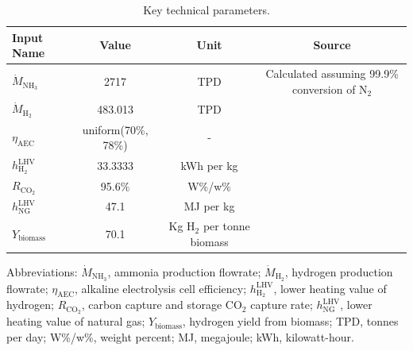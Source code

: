 \documentclass{article}
\begin{document}
\begin{table}[H]
  \centering
  \caption{Key technical parameters.}
  \label{table:si_technical5_key_technical_parameters}
  \begin{threeparttable}
    \begin{tabular}{@{}lccc@{}}
      \toprule
      \textbf{Input Name} & \textbf{Value} & \textbf{Unit} & \textbf{Source} \\ \midrule
      $\dot{M}_{\text{NH}_3}$ & 2717 & TPD & Calculated assuming 99.9\% conversion of N$_2$ \\
      $\dot{M}_{\text{H}_2}$ & 483.013 & TPD & \cite{LEWIS2022} \\
      $\eta_{\text{AEC}}$ & uniform(70\%, 78\%) & - & \cite{Brauns2020} \\
      $h_{\text{H}_2}^{\text{LHV}}$ & 33.3333 & kWh per kg & \\
      $R_{\text{CO}_2}$ & 95.6\% & W\%/w\% & \cite{LEWIS2022} \\
      $h_{\text{NG}}^{\text{LHV}}$ & 47.1 & MJ per kg & \cite{LEWIS2022}  \\
      $Y_{\text{biomass}}$ & 70.1 & Kg H$_2$ per tonne biomass & \cite{Spath2005} \\ \bottomrule
    \end{tabular}
    \begin{tablenotes}
  \small
  \item Abbreviations: $\dot{M}_{\text{NH}_3}$, ammonia production flowrate; $\dot{M}_{\text{H}_2}$, hydrogen production flowrate; $\eta_{\text{AEC}}$, alkaline electrolysis cell efficiency; $h_{\text{H}_2}^{\text{LHV}}$, lower heating value of hydrogen; $R_{\text{CO}_2}$, carbon capture and storage CO$_2$ capture rate; $h_{\text{NG}}^{\text{LHV}}$, lower heating value of natural gas; $Y_{\text{biomass}}$, hydrogen yield from biomass; TPD, tonnes per day; W\%/w\%, weight percent; MJ, megajoule; kWh, kilowatt-hour.
\end{tablenotes}

  \end{threeparttable}
\end{table}
\end{document}
